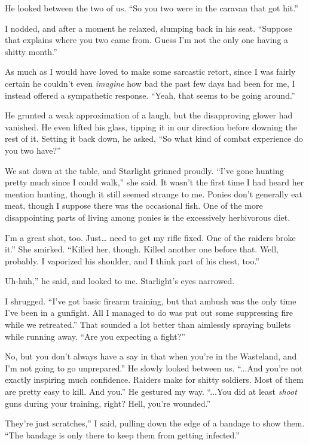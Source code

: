 He looked between the two of us. “So you two were in the caravan that got hit.”

I nodded, and after a moment he relaxed, slumping back in his seat. “Suppose that explains where you two came from. Guess I’m not the only one having a shitty month.”

As much as I would have loved to make some sarcastic retort, since I was fairly certain he couldn’t even \textit{imagine} how bad the past few days had been for me, I instead offered a sympathetic response. “Yeah, that seems to be going around.”

He grunted a weak approximation of a laugh, but the disapproving glower had vanished. He even lifted his glass, tipping it in our direction before downing the rest of it. Setting it back down, he asked, “So what kind of combat experience do you two have?”

We sat down at the table, and Starlight grinned proudly. “I’ve gone hunting pretty much since I could walk,” she said. It wasn’t the first time I had heard her mention hunting, though it still seemed strange to me. Ponies don’t generally eat meat, though I suppose there was the occasional fish. One of the more disappointing parts of living among ponies is the excessively herbivorous diet.

\leavevmode{}I’m a great shot, too. Just… need to get my rifle fixed. One of the raiders broke it.” She smirked. “Killed her, though. Killed another one before that. Well, probably. I vaporized his shoulder, and I think part of his chest, too.”

\leavevmode{}Uh-huh,” he said, and looked to me. Starlight’s eyes narrowed.

I shrugged. “I’ve got basic firearm training, but that ambush was the only time I’ve been in a gunfight. All I managed to do was put out some suppressing fire while we retreated.” That sounded a lot better than aimlessly spraying bullets while running away. “Are you expecting a fight?”

\leavevmode{}No, but you don’t always have a say in that when you’re in the Wasteland, and I’m not going to go unprepared.” He slowly looked between us. “...And you’re not exactly inspiring much confidence. Raiders make for shitty soldiers. Most of them are pretty easy to kill. And you.” He gestured my way. “...You did at least \textit{shoot} guns during your training, right? Hell, you’re wounded.”

\leavevmode{}They’re just scratches,” I said, pulling down the edge of a bandage to show them. “The bandage is only there to keep them from getting infected.”


